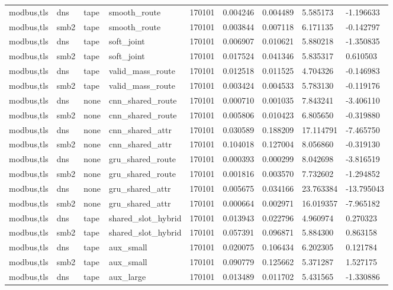 \begin{tabular}{lllllllll}
modbus,tls & dns & tape & smooth\_route & 170101 & 0.004246 & 0.004489 & 5.585173 & -1.196633 \\
modbus,tls & smb2 & tape & smooth\_route & 170101 & 0.003844 & 0.007118 & 6.171135 & -0.142797 \\
modbus,tls & dns & tape & soft\_joint & 170101 & 0.006907 & 0.010621 & 5.880218 & -1.350835 \\
modbus,tls & smb2 & tape & soft\_joint & 170101 & 0.017524 & 0.041346 & 5.835317 & 0.610503 \\
modbus,tls & dns & tape & valid\_mass\_route & 170101 & 0.012518 & 0.011525 & 4.704326 & -0.146983 \\
modbus,tls & smb2 & tape & valid\_mass\_route & 170101 & 0.003424 & 0.004533 & 5.783130 & -0.119176 \\
modbus,tls & dns & none & cnn\_shared\_route & 170101 & 0.000710 & 0.001035 & 7.843241 & -3.406110 \\
modbus,tls & smb2 & none & cnn\_shared\_route & 170101 & 0.005806 & 0.010423 & 6.805650 & -0.319880 \\
modbus,tls & dns & none & cnn\_shared\_attr & 170101 & 0.030589 & 0.188209 & 17.114791 & -7.465750 \\
modbus,tls & smb2 & none & cnn\_shared\_attr & 170101 & 0.104018 & 0.127004 & 8.056860 & -0.319130 \\
modbus,tls & dns & none & gru\_shared\_route & 170101 & 0.000393 & 0.000299 & 8.042698 & -3.816519 \\
modbus,tls & smb2 & none & gru\_shared\_route & 170101 & 0.001816 & 0.003570 & 7.732602 & -1.294852 \\
modbus,tls & dns & none & gru\_shared\_attr & 170101 & 0.005675 & 0.034166 & 23.763384 & -13.795043 \\
modbus,tls & smb2 & none & gru\_shared\_attr & 170101 & 0.000664 & 0.002971 & 16.019357 & -7.965182 \\
modbus,tls & dns & tape & shared\_slot\_hybrid & 170101 & 0.013943 & 0.022796 & 4.960974 & 0.270323 \\
modbus,tls & smb2 & tape & shared\_slot\_hybrid & 170101 & 0.057391 & 0.096871 & 5.884300 & 0.863158 \\
modbus,tls & dns & tape & aux\_small & 170101 & 0.020075 & 0.106434 & 6.202305 & 0.121784 \\
modbus,tls & smb2 & tape & aux\_small & 170101 & 0.090779 & 0.125662 & 5.371287 & 1.527175 \\
modbus,tls & dns & tape & aux\_large & 170101 & 0.013489 & 0.011702 & 5.431565 & -1.330886 \\

\end{tabular}
